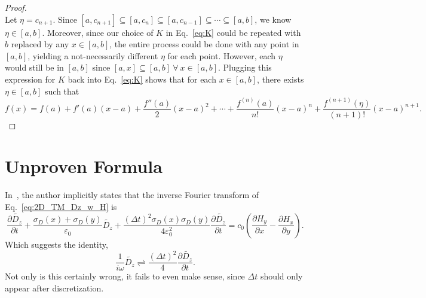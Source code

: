 \documentclass[12pt]{article}
\begin{document}
\begin{proof}
\begin{equation}
\end{equation}
Let $\eta=c_{n+1}$. Since $[a,c_{n+1}]\subseteq[a,c_n]\subseteq[a,c_{n-1}]\subseteq\cdots\subseteq[a,b]$, we know $\eta\in[a,b]$. Moreover, since our choice of $K$ in Eq.~\ref{eq:K} could be repeated with $b$ replaced by any $x\in[a,b]$, the entire process could be done with any point in $[a,b]$, yielding a not-necessarily different $\eta$ for each point. However, each $\eta$ would still be in $[a,b]$ since $[a,x]\subseteq[a,b]~\forall~x\in[a,b]$. Plugging this expression for $K$ back into Eq.~\ref{eq:K} shows that for each $x\in[a,b]$, there exists $\eta\in[a,b]$ such that
\begin{equation}
f(x) = f(a) + f'(a)(x-a) + \frac{f''(a)}{2}(x-a)^2 + \cdots + \frac{f^{(n)}(a)}{n!}(x-a)^n + \frac{f^{(n+1)}(\eta)}{(n+1)!}(x-a)^{n+1}.
\end{equation}
\end{proof}
\newpage
\section{Unproven Formula}
\label{ap:Sullivan}
In~\cite{Sullivan00}, the author implicitly states that the inverse Fourier transform of Eq.~\ref{eq:2D_TM_Dz_w_H} is
\begin{equation}
\label{eq:Sullivan_continuous1}
\frac{\partial \tilde{D_z}}{\partial t} + \frac{\sigma_D(x)+\sigma_D(y)}{\varepsilon_0}\tilde{D_z} + \frac{(\Delta t)^2\sigma_D(x)\sigma_D(y)}{4\varepsilon_0^2}\frac{\partial \tilde{D_z}}{\partial t} = c_0\left(\frac{\partial H_y}{\partial x}-\frac{\partial H_x}{\partial y}\right).
\end{equation}
Which suggests the identity,
\begin{equation*}
\frac{1}{i\omega}\tilde{D_z} \rightleftharpoons \frac{(\Delta t)^2}{4} \frac{\partial \tilde{D_z}}{\partial t}.
\end{equation*}
Not only is this certainly wrong, it fails to even make sense, since $\Delta t$ should only appear after discretization.
\end{document}
